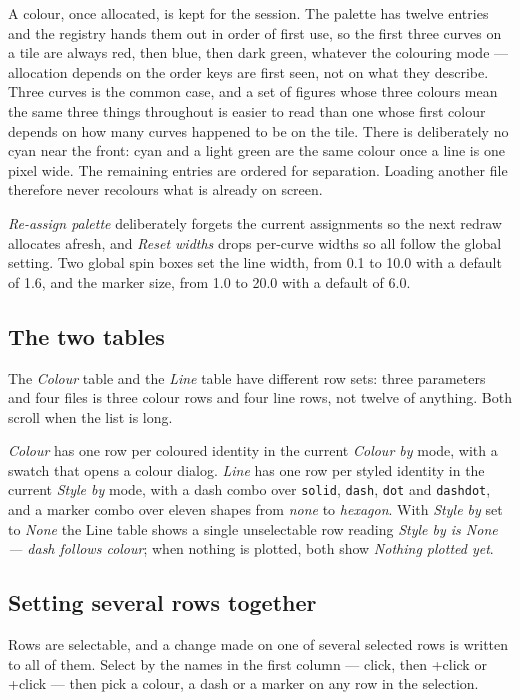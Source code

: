 \documentclass[11pt,a4paper,oneside]{report}
\newcommand{\code}[1]{\texttt{#1}}
\newcommand{\key}[1]{\textsf{\small\fbox{#1}}}
\begin{document}
A colour, once allocated, is kept for the session. The palette has twelve entries
and the registry hands them out in order of first use, so the first three curves
on a tile are always red, then blue, then dark green, whatever the colouring mode
--- allocation depends on the order keys are first seen, not on what they
describe. Three curves is the common case, and a set of figures whose three
colours mean the same three things throughout is easier to read than one whose
first colour depends on how many curves happened to be on the tile. There is
deliberately no cyan near the front: cyan and a light green are the same colour
once a line is one pixel wide. The remaining entries are ordered for separation.
Loading another file therefore never recolours what is already on screen.

\emph{Re-assign palette} deliberately forgets the current assignments so the next
redraw allocates afresh, and \emph{Reset widths} drops per-curve widths so all
follow the global setting. Two global spin boxes set the line width, from 0.1 to
10.0 with a default of 1.6, and the marker size, from 1.0 to 20.0 with a default
of 6.0.

\subsection{The two tables}

The \emph{Colour} table and the \emph{Line} table have different row sets:
three parameters and four files is three colour rows and four line rows, not
twelve of anything. Both scroll when the list is long.

\emph{Colour} has one row per coloured identity in the current \emph{Colour by}
mode, with a swatch that opens a colour dialog. \emph{Line} has one row per
styled identity in the current \emph{Style by} mode, with a dash combo over
\code{solid}, \code{dash}, \code{dot} and \code{dashdot}, and a marker combo over
eleven shapes from \emph{none} to \emph{hexagon}. With \emph{Style by} set to
\emph{None} the Line table shows a single unselectable row reading \emph{Style by
is None --- dash follows colour}; when nothing is plotted, both show
\emph{Nothing plotted yet}.

\subsection{Setting several rows together}

Rows are selectable, and a change made on one of several selected rows is
written to all of them. Select by the names in the first column --- click,
then \key{Ctrl}+click or \key{Shift}+click --- then pick a colour, a dash or a
marker on any row in the selection.
\end{document}
